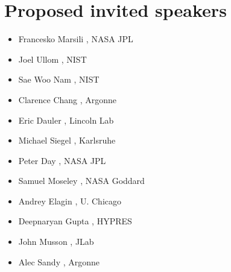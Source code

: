 \documentclass[12pt]{article}
\begin{document}
\section{Proposed invited speakers}
\begin{itemize}
\item Francesko Marsili , NASA JPL
\item Joel Ullom	, NIST
\item Sae Woo Nam	, NIST
\item Clarence Chang 	, Argonne
\item Eric Dauler	, Lincoln Lab
\item Michael Siegel	, Karlsruhe
\item Peter  Day	, NASA JPL
\item Samuel Moseley	, NASA Goddard
\item Andrey Elagin	, U. Chicago
\item Deepnaryan Gupta  , HYPRES
\item John Musson       , JLab
\item Alec Sandy        , Argonne
\end{itemize}
\end{document}
